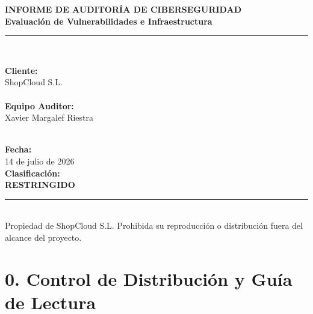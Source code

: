 \documentclass[11pt,a4paper]{report}
\begin{document}
\begin{titlepage}
    \centering
    \vspace*{1.5cm}
    {\LARGE\bfseries\color{darkblue} INFORME DE AUDITORÍA DE CIBERSEGURIDAD}\\[0.4cm]
    {\large\bfseries\color{secblue} Evaluación de Vulnerabilidades e Infraestructura}\\[2.5cm]
    
    \noindent\rule{\textwidth}{1pt}\\[1.5cm]
    
    \begin{minipage}{0.6\textwidth}
        \large
        \textbf{Cliente:} \\
        ShopCloud S.L. \\\\
        \textbf{Equipo Auditor:} \\
        Xavier Margalef Riestra \\\\
    \end{minipage}
    \begin{minipage}{0.39\textwidth}
        \flushright
        \large
        \textbf{Fecha:} \\
        14 de julio de 2026 \\[1cm]
        \textbf{Clasificación:} \\
        \textbf{RESTRINGIDO}
    \end{minipage}
    
    \vfill
    \noindent\rule{\textwidth}{1pt}\\[0.5cm]
    {\small Propiedad de ShopCloud S.L. Prohibida su reproducción o distribución fuera del alcance del proyecto.}
\end{titlepage}

\clearpage
{}
\tableofcontents
\clearpage
{}

\chapter*{0. Control de Distribución y Guía de Lectura}
\end{document}
